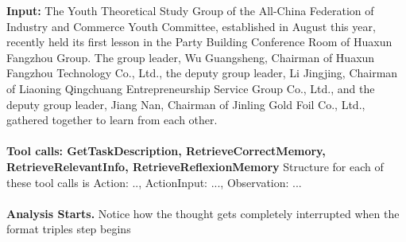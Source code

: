 \textbf{Input:} The Youth Theoretical Study Group of the All-China Federation of Industry and Commerce Youth Committee, established in August this year, recently held its first lesson in the Party Building Conference Room of Huaxun Fangzhou Group. The group leader, Wu Guangsheng, Chairman of Huaxun Fangzhou Technology Co., Ltd., the deputy group leader, Li Jingjing, Chairman of Liaoning Qingchuang Entrepreneurship Service Group Co., Ltd., and the deputy group leader, Jiang Nan, Chairman of Jinling Gold Foil Co., Ltd., gathered together to learn from each other.\\
~\\

\textbf{Tool calls: GetTaskDescription, RetrieveCorrectMemory, RetrieveRelevantInfo, RetrieveReflexionMemory}
Structure for each of these tool calls is Action: .., ActionInput: ..., Observation: ...\\
~\\
\textbf{Analysis Starts.} Notice how the thought gets completely interrupted when the format triples step begins


